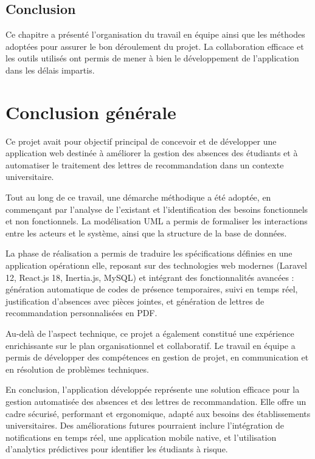 \documentclass[12pt, a4paper, openright]{report}
\begin{document}
\section{Conclusion}

Ce chapitre a présenté l'organisation du travail en équipe ainsi que les méthodes adoptées pour assurer le bon déroulement du projet. La collaboration efficace et les outils utilisés ont permis de mener à bien le développement de l'application dans les délais impartis.

\cleardoublepage
\chapter*{Conclusion générale}
\thispagestyle{fancy}

Ce projet avait pour objectif principal de concevoir et de développer une application web destinée à améliorer la gestion des absences des étudiants et à automatiser le traitement des lettres de recommandation dans un contexte universitaire.

Tout au long de ce travail, une démarche méthodique a été adoptée, en commençant par l'analyse de l'existant et l'identification des besoins fonctionnels et non fonctionnels. La modélisation UML a permis de formaliser les interactions entre les acteurs et le système, ainsi que la structure de la base de données.

La phase de réalisation a permis de traduire les spécifications définies en une application opérationn elle, reposant sur des technologies web modernes (Laravel 12, React.js 18, Inertia.js, MySQL) et intégrant des fonctionnalités avancées : génération automatique de codes de présence temporaires, suivi en temps réel, justification d'absences avec pièces jointes, et génération de lettres de recommandation personnalisées en PDF.

Au-delà de l'aspect technique, ce projet a également constitué une expérience enrichissante sur le plan organisationnel et collaboratif. Le travail en équipe a permis de développer des compétences en gestion de projet, en communication et en résolution de problèmes techniques.

En conclusion, l'application développée représente une solution efficace pour la gestion automatisée des absences et des lettres de recommandation. Elle offre un cadre sécurisé, performant et ergonomique, adapté aux besoins des établissements universitaires. Des améliorations futures pourraient inclure l'intégration de notifications en temps réel, une application mobile native, et l'utilisation d'analytics prédictives pour identifier les étudiants à risque.
%
\end{document}
